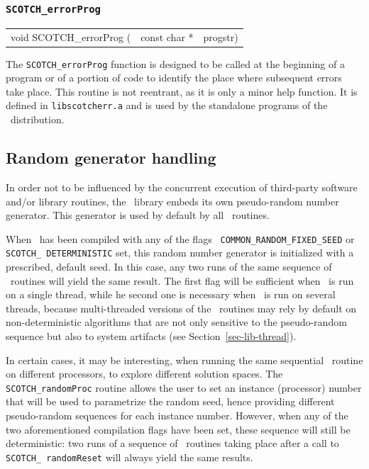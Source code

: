 \subsubsection{{\tt SCOTCH\_errorProg}}

\begin{itemize}
\progsyn

{\tt\begin{tabular}{l@{}ll}
void SCOTCH\_errorProg ( & const char * & progstr)
\end{tabular}}

\progdes

The {\tt SCOTCH\_errorProg} function is designed to be called at
the beginning of a program or of a portion of code to identify the
place where subsequent errors take place.
This routine is not reentrant, as it is only a minor help function. It
is defined in {\tt lib\lbt scotch\lbt err.a} and is used by the
standalone programs of the \scotch\ distribution.
\end{itemize}

\subsection{Random generator handling}
\label{sec-lib-func-random}

In order not to be influenced by the concurrent execution of third-party
software and/or library routines, the \libscotch\ library embeds its
own pseudo-random number generator. This generator is used by default
by all \libscotch\ routines.

When \scotch\ has been compiled with any of the flags {\tt
COMMON\_\lbt RANDOM\_\lbt FIXED\_\lbt SEED} or {\tt SCOTCH\_\lbt
DETERMINISTIC} set, this random number generator is initialized with
a prescribed, default seed. In this case, any two runs of the same
sequence of \libscotch\ routines will yield the same result. The
first flag will be sufficient when \scotch\ is run on a single thread,
while he second one is necessary when \scotch\ is run on several
threads, because multi-threaded versions of the \libscotch\ routines
may rely by default on non-deterministic algorithms that are not only
sensitive to the pseudo-random sequence but also to system artifacts
(see Section~\ref{sec-lib-thread}).

In certain cases, it may be interesting, when running the same
sequential \scotch\ routine on different processors, to explore
different solution spaces. The \texttt{SCOTCH\_\lbt random\lbt Proc}
routine allows the user to set an instance (processor) number that
will be used to parametrize the random seed, hence providing different
pseudo-random sequences for each instance number. However, when any of
the two aforementioned compilation flags have been set, these sequence
will still be deterministic: two runs of a sequence of
\libscotch\ routines taking place after a call to \texttt{SCOTCH\_\lbt
random\lbt Reset} will always yield the same results.

